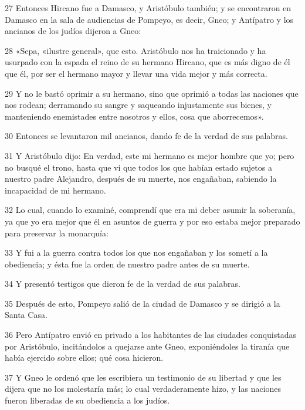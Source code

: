 \par 27 Entonces Hircano fue a Damasco, y Aristóbulo también; y se encontraron en Damasco en la sala de audiencias de Pompeyo, es decir, Gneo; y Antípatro y los ancianos de los judíos dijeron a Gneo:

\par 28 «Sepa, «ilustre general», que esto. Aristóbulo nos ha traicionado y ha usurpado con la espada el reino de su hermano Hircano, que es más digno de él que él, por ser el hermano mayor y llevar una vida mejor y más correcta.

\par 29 Y no le bastó oprimir a su hermano, sino que oprimió a todas las naciones que nos rodean; derramando su sangre y saqueando injustamente sus bienes, y manteniendo enemistades entre nosotros y ellos, cosa que aborrecemos».

\par 30 Entonces se levantaron mil ancianos, dando fe de la verdad de sus palabras.

\par 31 Y Aristóbulo dijo: En verdad, este mi hermano es mejor hombre que yo; pero no busqué el trono, hasta que vi que todos los que habían estado sujetos a nuestro padre Alejandro, después de su muerte, nos engañaban, sabiendo la incapacidad de mi hermano.

\par 32 Lo cual, cuando lo examiné, comprendí que era mi deber asumir la soberanía, ya que yo era mejor que él en asuntos de guerra y por eso estaba mejor preparado para preservar la monarquía:

\par 33 Y fui a la guerra contra todos los que nos engañaban y los sometí a la obediencia; y ésta fue la orden de nuestro padre antes de su muerte.

\par 34 Y presentó testigos que dieron fe de la verdad de sus palabras.

\par 35 Después de esto, Pompeyo salió de la ciudad de Damasco y se dirigió a la Santa Casa.

\par 36 Pero Antípatro envió en privado a los habitantes de las ciudades conquistadas por Aristóbulo, incitándolos a quejarse ante Gneo, exponiéndoles la tiranía que había ejercido sobre ellos; qué cosa hicieron.

\par 37 Y Gneo le ordenó que les escribiera un testimonio de su libertad y que les dijera que no los molestaría más; lo cual verdaderamente hizo, y las naciones fueron liberadas de su obediencia a los judíos.

